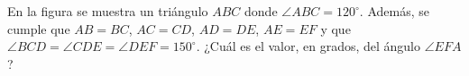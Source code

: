 En la figura se muestra un triángulo $ABC$ donde $\angle ABC = 120^\circ$. Además, se cumple que $AB = BC$, $A C = C D$, $A D = D E$, $A E = E F$ y que $\angle  B C D = \angle  C D E = \angle  D E F = 1 5 0 ^\circ$. ¿Cuál es el valor, en grados, del ángulo $\angle EFA$?